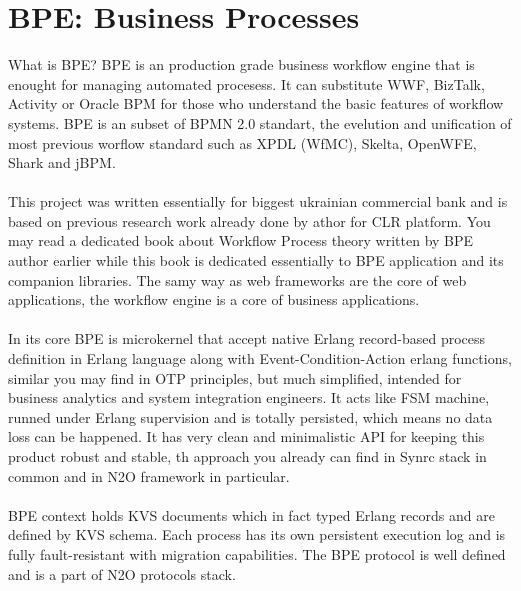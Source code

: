 \section{BPE: Business Processes}

What is BPE? BPE is an production grade business workflow engine that
is enought for managing automated procesess.
It can substitute WWF, BizTalk, Activity or Oracle BPM for those who
understand the basic features of workflow systems.
BPE is an subset of BPMN 2.0 standart, the evelution and unification
of most previous worflow standard such as XPDL (WfMC), Skelta, OpenWFE,
Shark and jBPM.

\paragraph{}
This project was written essentially for biggest ukrainian commercial
bank and is based on previous research work already done by athor
for CLR platform. You may read a dedicated book about Workflow Process
theory written by BPE author earlier while this book is dedicated
essentially to BPE application and its companion libraries.
The samy way as web frameworks are the core of web applications,
the workflow engine is a core of business applications.

\paragraph{}
In its core BPE is microkernel that accept native Erlang record-based
process definition in Erlang language along with Event-Condition-Action
erlang functions, similar you may find in OTP principles, but much simplified,
intended for business analytics and system integration engineers. It acts
like FSM machine, runned under Erlang supervision and is totally persisted,
which means no data loss can be happened. It has very clean and minimalistic
API for keeping this product robust and stable, th approach you already
can find in Synrc stack in common and in N2O framework in particular.

\paragraph{}
BPE context holds KVS documents which in fact typed Erlang
records and are defined by KVS schema. Each process has its own persistent
execution log and is fully fault-resistant with migration capabilities.
The BPE protocol is well defined and is a part of N2O protocols stack.

